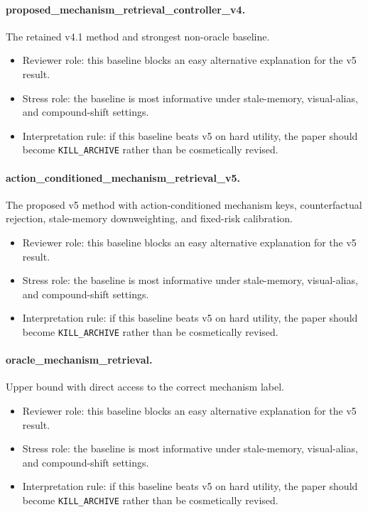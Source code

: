 \documentclass{article}
\begin{document}
\paragraph{proposed\_mechanism\_retrieval\_controller\_v4.} The retained v4.1 method and strongest non-oracle baseline.
\begin{itemize}
\item Reviewer role: this baseline blocks an easy alternative explanation for the v5 result.
\item Stress role: the baseline is most informative under stale-memory, visual-alias, and compound-shift settings.
\item Interpretation rule: if this baseline beats v5 on hard utility, the paper should become \texttt{KILL\_ARCHIVE} rather than be cosmetically revised.
\end{itemize}
\paragraph{action\_conditioned\_mechanism\_retrieval\_v5.} The proposed v5 method with action-conditioned mechanism keys, counterfactual rejection, stale-memory downweighting, and fixed-risk calibration.
\begin{itemize}
\item Reviewer role: this baseline blocks an easy alternative explanation for the v5 result.
\item Stress role: the baseline is most informative under stale-memory, visual-alias, and compound-shift settings.
\item Interpretation rule: if this baseline beats v5 on hard utility, the paper should become \texttt{KILL\_ARCHIVE} rather than be cosmetically revised.
\end{itemize}
\paragraph{oracle\_mechanism\_retrieval.} Upper bound with direct access to the correct mechanism label.
\begin{itemize}
\item Reviewer role: this baseline blocks an easy alternative explanation for the v5 result.
\item Stress role: the baseline is most informative under stale-memory, visual-alias, and compound-shift settings.
\item Interpretation rule: if this baseline beats v5 on hard utility, the paper should become \texttt{KILL\_ARCHIVE} rather than be cosmetically revised.
\end{itemize}
\clearpage
\end{document}

